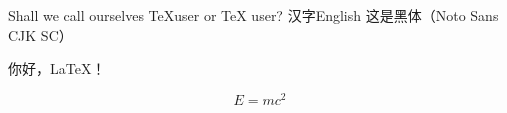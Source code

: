 \documentclass[12pt,fontset=none]{ctexart}
\begin{document}
Shall we call ourselves
\TeX user
or \TeX{} user?
汉字English
{\sffamily 这是黑体（Noto Sans CJK SC）}

你好，LaTeX！

\[
E = mc^2
\]
\end{document}

